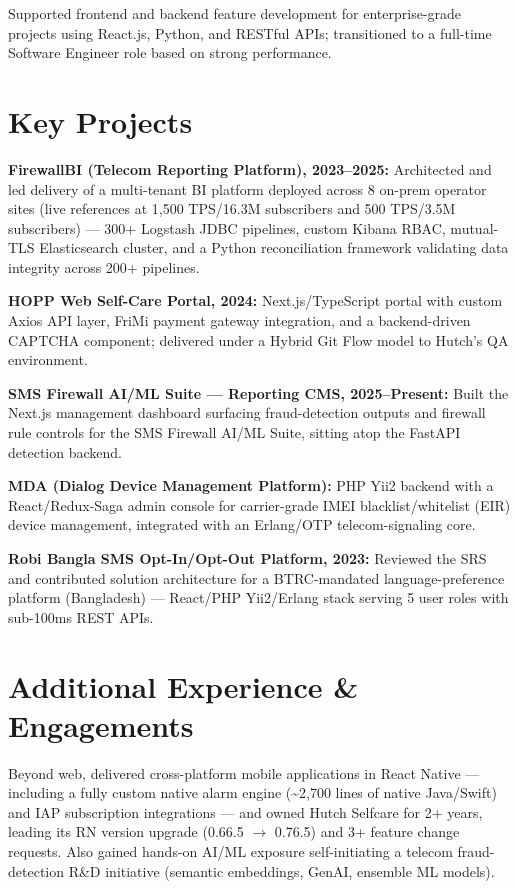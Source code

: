 \documentclass[10.5pt]{article}
\begin{document}
\begin{cvitems}
  \item Supported frontend and backend feature development for enterprise-grade projects using React.js, Python, and RESTful APIs; transitioned to a full-time Software Engineer role based on strong performance.
\end{cvitems}

\section*{Key Projects}
\begin{cvitems}
  \item \textbf{FirewallBI (Telecom Reporting Platform), 2023--2025:} Architected and led delivery of a multi-tenant BI platform deployed across 8 on-prem operator sites (live references at 1,500 TPS/16.3M subscribers and 500 TPS/3.5M subscribers) --- 300+ Logstash JDBC pipelines, custom Kibana RBAC, mutual-TLS Elasticsearch cluster, and a Python reconciliation framework validating data integrity across 200+ pipelines.
  \item \textbf{HOPP Web Self-Care Portal, 2024:} Next.js/TypeScript portal with custom Axios API layer, FriMi payment gateway integration, and a backend-driven CAPTCHA component; delivered under a Hybrid Git Flow model to Hutch's QA environment.
  \item \textbf{SMS Firewall AI/ML Suite --- Reporting CMS, 2025--Present:} Built the Next.js management dashboard surfacing fraud-detection outputs and firewall rule controls for the SMS Firewall AI/ML Suite, sitting atop the FastAPI detection backend.
  \item \textbf{MDA (Dialog Device Management Platform):} PHP Yii2 backend with a React/Redux-Saga admin console for carrier-grade IMEI blacklist/whitelist (EIR) device management, integrated with an Erlang/OTP telecom-signaling core.
  \item \textbf{Robi Bangla SMS Opt-In/Opt-Out Platform, 2023:} Reviewed the SRS and contributed solution architecture for a BTRC-mandated language-preference platform (Bangladesh) --- React/PHP Yii2/Erlang stack serving 5 user roles with sub-100ms REST APIs.
\end{cvitems}

\section*{Additional Experience \& Engagements}
Beyond web, delivered cross-platform mobile applications in React Native --- including a fully custom native alarm engine (\textasciitilde2,700 lines of native Java/Swift) and IAP subscription integrations --- and owned Hutch Selfcare for 2+ years, leading its RN version upgrade (0.66.5 $\rightarrow$ 0.76.5) and 3+ feature change requests. Also gained hands-on AI/ML exposure self-initiating a telecom fraud-detection R\&D initiative (semantic embeddings, GenAI, ensemble ML models).
\end{document}
